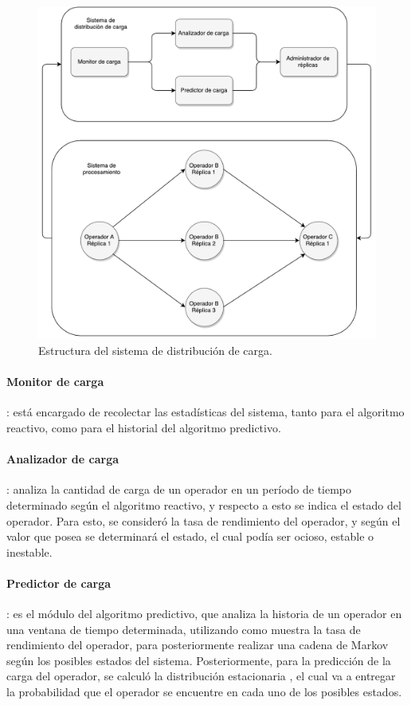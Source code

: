 \begin{figure}[ht!]
  \centering
    \includegraphics[scale=0.5]{images/Diagrama.pdf}
  \caption{Estructura del sistema de distribución de carga.}
  \label{fig:componentesSistemas}
\end{figure}

\paragraph{Monitor de carga}: está encargado de recolectar las estadísticas del sistema, tanto para el algoritmo reactivo, como para el historial del algoritmo predictivo.

\paragraph{Analizador de carga}: analiza la cantidad de carga de un operador en un período de tiempo determinado según el algoritmo reactivo, y respecto a esto se indica el estado del operador. Para esto, se consideró la tasa de rendimiento del operador, y según el valor que posea se determinará el estado, el cual podía ser ocioso, estable o inestable.

\paragraph{Predictor de carga}: es el módulo del algoritmo predictivo, que analiza la historia de un operador en una ventana de tiempo determinada, utilizando como muestra la tasa de rendimiento del operador, para posteriormente realizar una cadena de Markov según los posibles estados del sistema. Posteriormente, para la predicción de la carga del operador, se calculó la distribución estacionaria \citep{Papoulis1984}, el cual va a entregar la probabilidad que el operador se encuentre en cada uno de los posibles estados.

